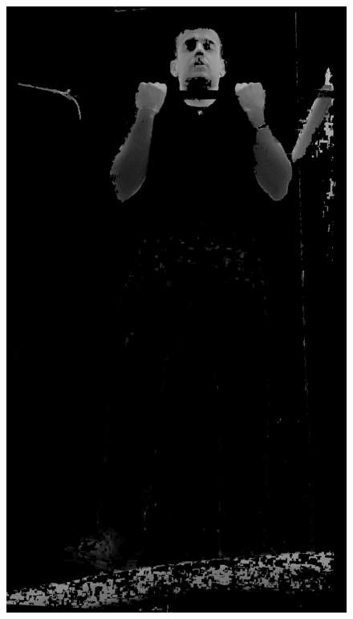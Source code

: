 \begin{figure}[!htbp]
    \centering
        \begin{minipage}{\sizeImg\textwidth}
            \includegraphics[width=\textwidth]{figuras/ultrapassar_barra/134_gray.png}
        \end{minipage}
        \begin{minipage}{\sizeImg\textwidth}

\end{minipage}
\end{figure}
